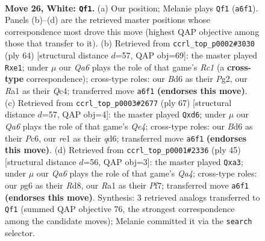 \documentclass[11pt]{article}
\begin{document}
\clearpage

\begin{figure}[p]\centering
\begin{subfigure}{0.46\textwidth}\centering
\resizebox{\linewidth}{!}{%
\newchessgame
\chessboard[
  setfen={4r1k1/p4p1p/Q2B2p1/8/3n4/P4q1P/5P2/R3r1K1 w - - 1 26},
  showmover=false,
  pgfstyle=straightmove, color=movearrow, markmove={a6-f1}
]}
\caption{}
\end{subfigure}\hfill
\begin{subfigure}{0.46\textwidth}\centering
\resizebox{\linewidth}{!}{%
\newchessgame
\chessboard[
  setfen={3r1k2/5pp1/2Pqp2p/p7/2Q5/5P1P/P5P1/2R1r1K1 w - - 0 33},
  showmover=false,
  pgfstyle=straightmove, color=movearrow, markmove={c1-e1}
]}
\caption{}
\end{subfigure}
\\[4pt]
\begin{subfigure}{0.46\textwidth}\centering
\resizebox{\linewidth}{!}{%
\newchessgame
\chessboard[
  setfen={1r6/6pk/2pQp2p/4q3/1P6/7P/5PP1/3R2K1 b - - 2 34},
  showmover=false,
  pgfstyle=straightmove, color=movearrow, markmove={e5-d6}
]}
\caption{}
\end{subfigure}\hfill
\begin{subfigure}{0.46\textwidth}\centering
\resizebox{\linewidth}{!}{%
\newchessgame
\chessboard[
  setfen={3r2k1/pQ3ppp/8/q7/4pP2/R3P3/3P2PP/5RK1 b - - 0 23},
  showmover=false,
  pgfstyle=straightmove, color=movearrow, markmove={a5-a3}
]}
\caption{}
\end{subfigure}
\caption{\textbf{Move 26, White: \texttt{Qf1}.} (a) Our position; Melanie plays \texttt{Qf1} (\texttt{a6f1}). Panels (b)--(d) are the retrieved master positions whose correspondence most drove this move (highest QAP objective among those that transfer to it). (b) Retrieved from \texttt{ccrl\_top\_p0002\#3030} (ply 64) [structural distance $d$=57, QAP obj=69]: the master played \texttt{Rxe1}; under $\mu$ our \emph{Qa6} plays the role of that game's \emph{Rc1} (a \textbf{cross-type} correspondence); cross-type roles: our \emph{B}d6 as their \emph{P}g2, our \emph{R}a1 as their \emph{Q}c4; transferred move \texttt{a6f1} \textbf{(endorses this move)}. (c) Retrieved from \texttt{ccrl\_top\_p0003\#2677} (ply 67) [structural distance $d$=57, QAP obj=4]: the master played \texttt{Qxd6}; under $\mu$ our \emph{Qa6} plays the role of that game's \emph{Qe4}; cross-type roles: our \emph{B}d6 as their \emph{P}c6, our \emph{r}e1 as their \emph{q}d6; transferred move \texttt{a6f1} \textbf{(endorses this move)}. (d) Retrieved from \texttt{ccrl\_top\_p0001\#2336} (ply 45) [structural distance $d$=56, QAP obj=3]: the master played \texttt{Qxa3}; under $\mu$ our \emph{Qa6} plays the role of that game's \emph{Qa4}; cross-type roles: our \emph{p}g6 as their \emph{R}d8, our \emph{R}a1 as their \emph{P}f7; transferred move \texttt{a6f1} \textbf{(endorses this move)}. Synthesis: 3 retrieved analogs transferred to \texttt{Qf1} (summed QAP objective 76, the strongest correspondence among the candidate moves); Melanie committed it via the \texttt{search} selector.}
\label{fig:thought-m50}
\end{figure}
\end{document}
